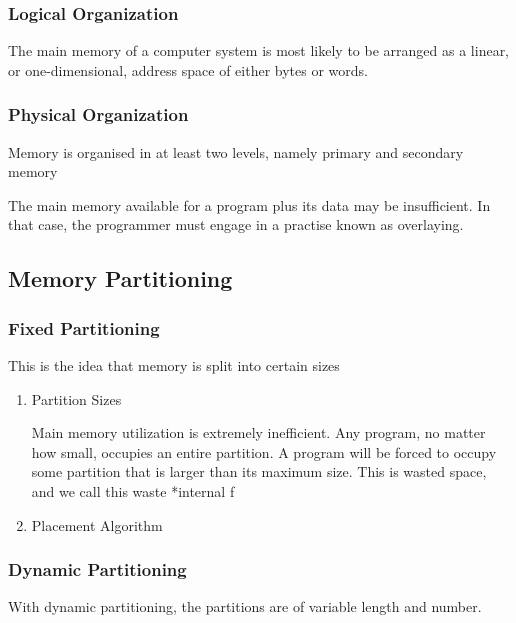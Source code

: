 \documentclass[11pt]{article}
\begin{document}
\subsubsection{Logical Organization}
\label{sec-1-1-4}

The main memory of a computer system is most likely to be
arranged as a linear, or one-dimensional, address space of
either bytes or words.

\subsubsection{Physical Organization}
\label{sec-1-1-5}

Memory is organised in at least two levels, namely primary
and secondary memory

The main memory available for a program plus its data may be
insufficient. In that case, the programmer must engage in a
practise known as overlaying.


\subsection{Memory Partitioning}
\label{sec-1-2}

\subsubsection{Fixed Partitioning}
\label{sec-1-2-1}

This is the idea that memory is split into certain sizes

\begin{enumerate}
\item Partition Sizes
\label{sec-1-2-1-1}

Main memory utilization is extremely inefficient. Any program, 
no matter how small, occupies an entire partition. A program
will be forced to occupy some partition that is larger than
its maximum size. This is wasted space, and we call this waste
*internal f

\item Placement Algorithm
\label{sec-1-2-1-2}
\end{enumerate}

\subsubsection{Dynamic Partitioning}
\label{sec-1-2-2}

With dynamic partitioning, the partitions are of variable 
length and number.
\end{document}
